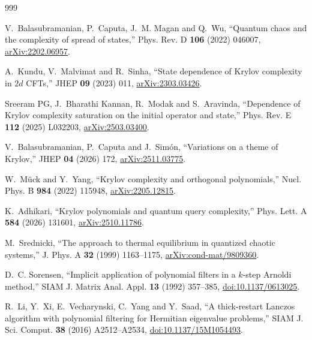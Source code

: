 \documentclass[a4paper,11pt]{article}
\theoremstyle{definition}
\theoremstyle{remark}
\begin{document}
\begin{thebibliography}{999}

V.~Balasubramanian, P.~Caputa, J.~M. Magan and Q.~Wu, ``Quantum chaos and the complexity of spread of states,'' Phys. Rev. D \textbf{106} (2022) 046007, \href{https://arxiv.org/abs/2202.06957}{arXiv:2202.06957}.

A.~Kundu, V.~Malvimat and R.~Sinha,
``State dependence of Krylov complexity in \(2d\) CFTs,''
JHEP \textbf{09} (2023) 011, \href{https://arxiv.org/abs/2303.03426}{arXiv:2303.03426}.

Sreeram PG, J.~Bharathi Kannan, R.~Modak and S.~Aravinda,
``Dependence of Krylov complexity saturation on the initial operator and state,'' Phys. Rev. E \textbf{112} (2025) L032203,
\href{https://arxiv.org/abs/2503.03400}{arXiv:2503.03400}.

V.~Balasubramanian, P.~Caputa and J.~Sim\'on, ``Variations on a theme of Krylov,'' JHEP \textbf{04} (2026) 172, \href{https://arxiv.org/abs/2511.03775}{arXiv:2511.03775}.

W.~M\"uck and Y.~Yang, ``Krylov complexity and orthogonal polynomials,'' Nucl. Phys. B \textbf{984} (2022) 115948, \href{https://arxiv.org/abs/2205.12815}{arXiv:2205.12815}.

K.~Adhikari, ``Krylov polynomials and quantum query complexity,''
Phys. Lett. A \textbf{584} (2026) 131601,
\href{https://arxiv.org/abs/2510.11786}{arXiv:2510.11786}.

M.~Srednicki,
``The approach to thermal equilibrium in quantized chaotic systems,''
J. Phys. A \textbf{32} (1999) 1163--1175,
\href{https://arxiv.org/abs/cond-mat/9809360}{arXiv:cond-mat/9809360}.

D.~C. Sorensen,
``Implicit application of polynomial filters in a $k$-step Arnoldi method,''
SIAM J. Matrix Anal. Appl. \textbf{13} (1992) 357--385,
\href{https://doi.org/10.1137/0613025}{doi:10.1137/0613025}.

R.~Li, Y.~Xi, E.~Vecharynski, C.~Yang and Y.~Saad,
``A thick-restart Lanczos algorithm with polynomial filtering for Hermitian eigenvalue problems,''
SIAM J. Sci. Comput. \textbf{38} (2016) A2512--A2534,
\href{https://doi.org/10.1137/15M1054493}{doi:10.1137/15M1054493}.


\end{thebibliography}
\end{document}
